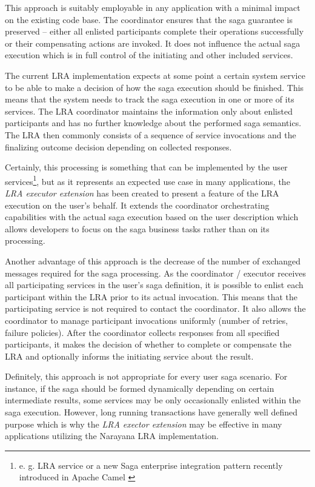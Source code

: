 \documentclass[oneside,
  digital, %
  table,   %
  lof,     %
  lot,     %
]{fithesis3}
\begin{document}
This approach is suitably employable in any application with a minimal impact on the existing code base. The coordinator ensures that the saga guarantee is preserved -- either all enlisted participants complete their operations successfully or their compensating actions are invoked. It does not influence the actual saga execution which is in full control of the initiating and other included services.

The current LRA implementation expects at some point a certain system service to be able to make a decision of how the saga execution should be finished. This means that the system needs to track the saga execution in one or more of its services. The LRA coordinator maintains the information only about enlisted participants and has no further knowledge about the performed saga semantics. The LRA then commonly consists of a sequence of service invocations and the finalizing outcome decision depending on collected responses.

Certainly, this processing is something that can be implemented by the user services\footnote{e. g. LRA service or a new Saga enterprise integration pattern recently introduced in Apache Camel \cite{camel_saga}}, but as it represents an expected use case in many applications, the \textit{LRA executor extension} has been created to present a feature of the LRA execution on the user's behalf. It extends the coordinator orchestrating capabilities with the actual saga execution based on the user description which allows developers to focus on the saga business tasks rather than on its processing.

Another advantage of this approach is the decrease of the number of exchanged messages required for the saga processing. As the coordinator / executor receives all participating services in the user's saga definition, it is possible to enlist each participant within the LRA prior to its actual invocation. This means that the participating service is not required to contact the coordinator. It also allows the coordinator to manage participant invocations uniformly (number of retries, failure policies). After the coordinator collects responses from all specified participants, it makes the decision of whether to complete or compensate the LRA and optionally informs the initiating service about the result.

Definitely, this approach is not appropriate for every user saga scenario. For instance, if the saga should be formed dynamically depending on certain intermediate results, some services may be only occasionally enlisted within the saga execution. However, long running transactions have generally well defined purpose which is why the \textit{LRA exector extension} may be effective in many applications utilizing the Narayana LRA implementation.
\end{document}

